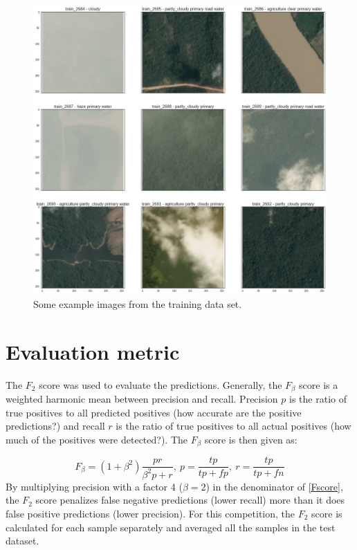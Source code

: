 \documentclass[fleqn]{homework}
\begin{document}
\begin{figure}[H]
	\centering
     \includegraphics[width=0.9\linewidth]{figures/images.png}
	\caption{Some example images from the training data set.}
	\label{images} 
\end{figure}

\section{Evaluation metric}
The $F_2$ score was used to evaluate the predictions. Generally, the $F_{\beta}$ score is a weighted harmonic mean between precision and recall. Precision $p$ is the ratio of true positives to all predicted positives (how accurate are the positive predictions?) and recall $r$ is the ratio of true positives to all actual positives (how much of the positives were detected?). The $F_{\beta}$ score is then given as:

\begin{equation}\label{Fscore}
F_{\beta} = (1+\beta^2)\frac{pr}{\beta^2p+r}, \ p = \frac{tp}{tp+fp}, \ r = \frac{tp}{tp+fn}
\end{equation}
By multiplying precision with a factor 4 ($\beta = 2$) in the denominator of \ref{Fscore}, the $F_2$ score penalizes false negative predictions (lower recall) more than it does false positive predictions (lower precision). For this competition, the $F_{2}$ score is calculated for each sample separately and averaged all the samples in the test dataset. 
\end{document}

